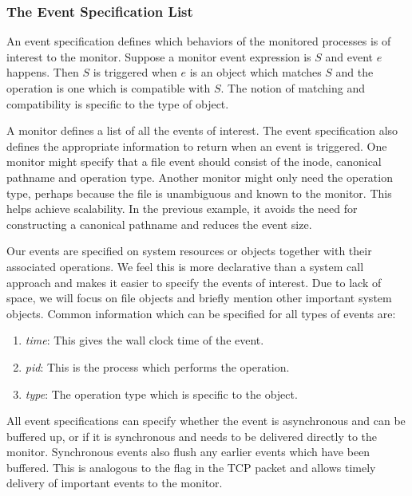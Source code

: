 \subsubsection{The Event Specification List}

An event specification defines which behaviors
of the monitored processes is of interest to the monitor.
Suppose a monitor event expression is $S$
and event $e$ happens. Then $S$ is triggered when $e$ is an object 
which matches $S$ and the operation is one which is compatible with $S$.
The notion of matching and compatibility is specific to the type of object.

A monitor defines a list of all the events of interest.
The event specification also defines the appropriate
information to return when an event is triggered.
One monitor might specify that a file event should 
consist of the inode, canonical pathname and operation type.
Another monitor might only need the operation type, perhaps because
the file is unambiguous and known to the monitor.
This helps achieve scalability. In the previous example,
it avoids the need for constructing a canonical
pathname and reduces the event size.

Our events are specified on system resources or objects together with their
associated operations. 
We feel this is more declarative than a system call approach
and makes it easier to specify the events of interest.
Due to lack of space, we will focus on file objects and briefly mention
other important system objects.
Common information which can be specified
for all types of events are:
\begin{enumerate}
\item {\em time}:
This gives the wall clock time of the event.
\item {\em pid}:
This is the process which performs the operation.
\item {\em type}:
The operation type which is specific to the object.
\end{enumerate}

All event specifications can 
specify whether the event is asynchronous and can be buffered up,
or if it is synchronous and needs to be delivered directly to the monitor.
Synchronous events also flush any earlier events which have been buffered.
This is analogous to the  flag in the TCP packet
and allows timely delivery of important events to the monitor.

